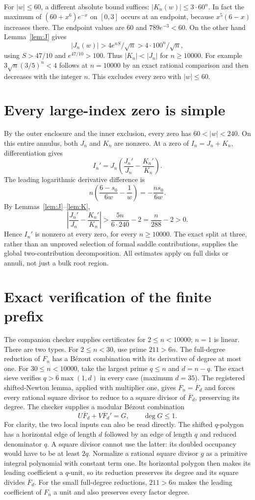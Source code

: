 \documentclass[11pt]{article}
\begin{document}
For $|w|\le60$, a different absolute bound suffices:
$|K_n(w)|\le3\cdot60^n$. In fact the maximum of
$(60+x^6)e^{-x}$ on $[0,3]$ occurs at an endpoint, because
$x^5(6-x)$ increases there. The endpoint values are $60$ and
$789e^{-3}<60$. On the other hand Lemma~\ref{lem:J} gives
\[
 |J_n(w)|>4e^{nS}/\sqrt n>4\cdot100^n/\sqrt n,
\]
using $S>47/10$ and $e^{47/10}>100$.
Thus $|K_n|<|J_n|$ for $n\ge10000$. For example
$3\sqrt n(3/5)^n<4$ follows at $n=10000$ by an exact rational
comparison and then decreases with the integer $n$.
This excludes every zero with $|w|\le60$.

\section{Every large-index zero is simple}
By the outer enclosure and the inner exclusion, every zero has
$60<|w|<240$. On this entire annulus, both $J_n$ and $K_n$ are nonzero.
At a zero of $I_n=J_n+K_n$, differentiation gives
\[
 I_n'=J_n\left(\frac{J_n'}{J_n}-\frac{K_n'}{K_n}\right).
\]
The leading logarithmic derivative difference is
\[
 n\left(\frac{6-s_0}{6w}-\frac1w\right)
                     =-\frac{ns_0}{6w}.
\]
By Lemmas~\ref{lem:J}--\ref{lem:K},
\[
 \left|\frac{J_n'}{J_n}-\frac{K_n'}{K_n}\right|
 >\frac{5n}{6\cdot240}-2=\frac n{288}-2>0.
\]
Hence $I_n'$ is nonzero at every zero, for every $n\ge10000$.
The exact split at three, rather than an unproved selection of formal
saddle contributions, supplies the global two-contribution decomposition.
All estimates apply on full disks or annuli, not just a bulk root region.

\section{Exact verification of the finite prefix}
The companion checker supplies certificates for $2\le n<10000$;
$n=1$ is linear. There are two types.
For $2\le n<30$, use prime $211>6n$. The full-degree reduction of
$F_n$ has a B\'ezout combination with its derivative of degree at most one.
For $30\le n<10000$, take the largest prime $q\le n$ and $d=n-q$.
The exact sieve verifies $q>6\max(1,d)$ in every case (maximum $d=35$).
The registered shifted-Newton lemma, applied with multiplier one, gives
$\overline F_n=\overline F_d$ and forces every rational square divisor
to reduce to a square divisor of $\overline F_d$, preserving its degree.
The checker supplies a modular B\'ezout combination
\[
                U\overline F_d+V\overline F_d'=G,
                \qquad \deg G\le1.
\]
For clarity, the two local inputs can also be read directly. The shifted
$q$-polygon has a horizontal edge of length $d$ followed by an edge of
length $q$ and reduced denominator $q$. A square divisor cannot use the
latter: its doubled occupancy would have to be at least $2q$. Normalize
a rational square divisor $g$ as a primitive integral polynomial with
constant term one. Its horizontal polygon then makes its leading
coefficient a $q$-unit, so its reduction preserves its degree and its
square divides $\overline F_d$. For the small full-degree reductions,
$211>6n$ makes the leading coefficient of $F_n$ a unit and also preserves
every factor degree.
\end{document}
